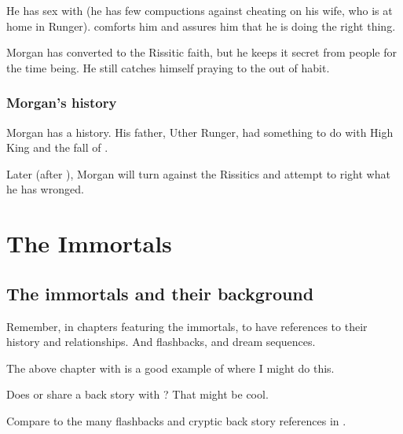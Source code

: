 He has sex with \Takestsha{} (he has few compuctions against cheating on his wife, who is at home in Runger). \Takestsha{} comforts him and assures him that he is doing the right thing. 

Morgan has converted to the Rissitic faith, but he keeps it secret from people for the time being. He still catches himself praying to the \Sephiroth{} out of habit. 





\subsubsection{Morgan's history}
Morgan has a history. His father, Uther Runger, had something to do with High King \LastHighKing{} and the fall of . 

Later (after \TwilightAngelRememberEmph), Morgan will turn against the Rissitics and attempt to right what he has wronged. 















\section{The Immortals}







\subsection{The immortals and their background}
Remember, in chapters featuring the immortals, to have references to their history and relationships. 
And flashbacks, and dream sequences.

The above chapter with \Achsah{} is a good example of where I might do this. 

Does \Achsah{} or \Teshrial{} share a back story with \Ishnaruchaefir? 
That might be cool. 

Compare to the many flashbacks and cryptic back story references in \cite{StevenEriksonIanCameronEsslemont:MalazanBookoftheFallen}. 









